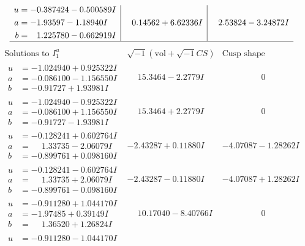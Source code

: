 \documentclass[1p]{elsarticle_modified}
\theoremstyle{definition}
\newcommand{\I}{\sqrt{-1}}
\begin{document}
$$\begin{array}{c|c|c}
\begin{aligned}
u &= -0.387424 - 0.500589 I \\
a &= -1.93597 - 1.18940 I \\
b &= \phantom{-}1.225780 - 0.662919 I\end{aligned}
 & \phantom{-}0.14562 + 6.62336 I & \phantom{-}2.53824 - 3.24872 I\\
 \hline 
 \end{array}$$\newpage$$\begin{array}{c|c|c}  
\text{Solutions to }I^u_{1}& \I (\text{vol} + \sqrt{-1}CS) & \text{Cusp shape}\\
 \hline 
\begin{aligned}
u &= -1.024940 + 0.925322 I \\
a &= -0.086100 - 1.156550 I \\
b &= -0.91727 + 1.93981 I\end{aligned}
 & \phantom{-}15.3464 - 2.2779 I & \phantom{-0.000000 } 0 \\ \hline\begin{aligned}
u &= -1.024940 - 0.925322 I \\
a &= -0.086100 + 1.156550 I \\
b &= -0.91727 - 1.93981 I\end{aligned}
 & \phantom{-}15.3464 + 2.2779 I & \phantom{-0.000000 } 0 \\ \hline\begin{aligned}
u &= -0.128241 + 0.602764 I \\
a &= \phantom{-}1.33735 - 2.06079 I \\
b &= -0.899761 + 0.098160 I\end{aligned}
 & -2.43287 + 0.11880 I & -4.07087 - 1.28262 I \\ \hline\begin{aligned}
u &= -0.128241 - 0.602764 I \\
a &= \phantom{-}1.33735 + 2.06079 I \\
b &= -0.899761 - 0.098160 I\end{aligned}
 & -2.43287 - 0.11880 I & -4.07087 + 1.28262 I \\ \hline\begin{aligned}
u &= -0.911280 + 1.044170 I \\
a &= -1.97485 + 0.39149 I \\
b &= \phantom{-}1.36520 + 1.26824 I\end{aligned}
 & \phantom{-}10.17040 - 8.40766 I & \phantom{-0.000000 } 0 \\ \hline\begin{aligned}
u &= -0.911280 - 1.044170 I \\

\end{aligned}
\end{array}$$
\end{document}
